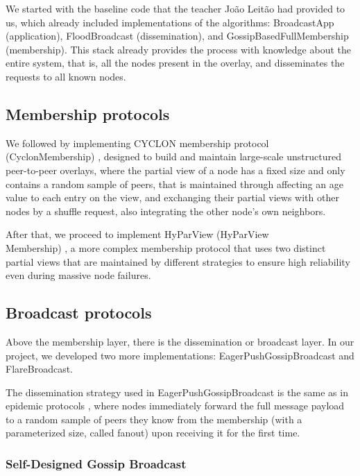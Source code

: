 \documentclass[sigconf,a4paper]{acmart}
\begin{document}
We started with the baseline code that the teacher João Leitão had provided to us, which already included 
implementations of the algorithms: BroadcastApp (application), FloodBroadcast (dissemination), and GossipBasedFullMembership 
(membership). This stack already provides the process with knowledge about the entire system, that is, all the nodes 
present in the overlay, and disseminates the requests to all known nodes.

\subsection{Membership protocols}

We followed by implementing CYCLON membership protocol (CyclonMembership) \cite{cyclon}, designed to build and maintain large-scale 
unstructured peer-to-peer overlays, where the partial view of a node has a fixed size and only contains a random 
sample of peers, that is maintained through affecting an age value to each entry on the view, and exchanging their 
partial views with other nodes by a shuffle request, also integrating the other node's own neighbors.

After that, we proceed to implement HyParView (HyParView\\Membership) \cite{hyparview}, a more complex membership protocol that uses two distinct 
partial views that are maintained by different strategies to ensure high reliability even during massive node failures.

\subsection{Broadcast protocols}

Above the membership layer, there is the dissemination or broadcast layer. In our project, we developed two more implementations: 
EagerPushGossipBroadcast and FlareBroadcast.

The dissemination strategy used in EagerPushGossipBroadcast is the same as in epidemic protocols \cite{epidemic-broadcast-trees}, where nodes immediately forward 
the full message payload to a random sample of peers they know from the membership (with a parameterized size, called fanout) upon receiving 
it for the first time.

\subsubsection{Self-Designed Gossip Broadcast}
\end{document}
